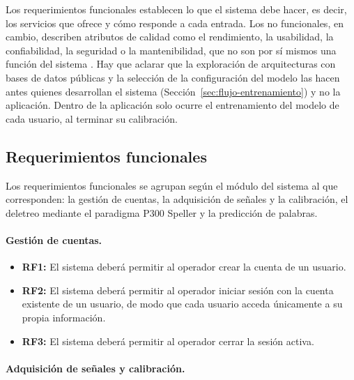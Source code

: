 Los requerimientos funcionales establecen lo que el sistema debe hacer, es decir, los servicios que
ofrece y cómo responde a cada entrada. Los no funcionales, en cambio, describen atributos de calidad
como el rendimiento, la usabilidad, la confiabilidad, la seguridad o la mantenibilidad, que no son
por sí mismos una función del sistema \cite{pressman2010}. Hay que aclarar que la exploración de
arquitecturas con bases de datos públicas y la selección de la configuración del modelo las hacen
antes quienes desarrollan el sistema (Sección~\ref{sec:flujo-entrenamiento}) y no la aplicación.
Dentro de la aplicación solo ocurre el entrenamiento del modelo de cada usuario, al terminar su
calibración.

\subsection{Requerimientos funcionales}

Los requerimientos funcionales se agrupan según el módulo del sistema al que corresponden: la
gestión de cuentas, la adquisición de señales y la calibración, el deletreo mediante el
paradigma P300 Speller y la predicción de palabras.

\paragraph{Gestión de cuentas.}

\begin{itemize}
  \item \textbf{RF1:} El sistema deberá permitir al operador crear la cuenta de un usuario.
  \item \textbf{RF2:} El sistema deberá permitir al operador iniciar sesión con la cuenta existente de un usuario, de modo
  que cada usuario acceda únicamente a su propia información.
  \item \textbf{RF3:} El sistema deberá permitir al operador cerrar la sesión activa.
\end{itemize}

\paragraph{Adquisición de señales y calibración.}

